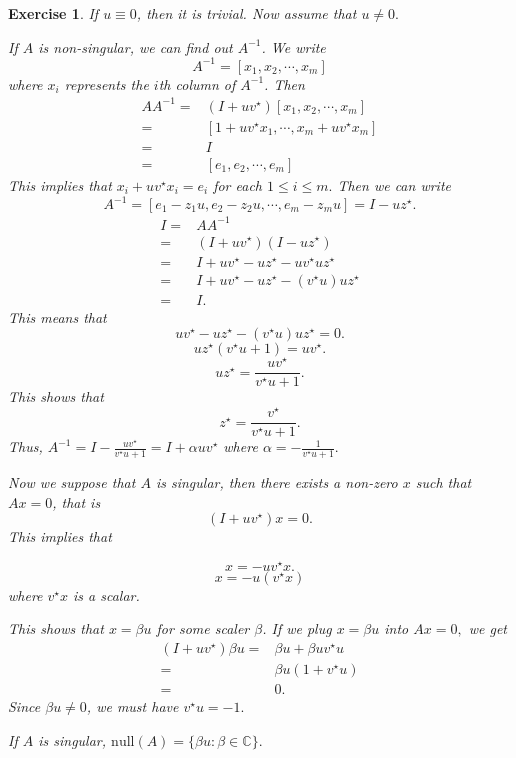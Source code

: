 \documentclass[paper=a4, fontsize=11pt]{scrartcl} %
\numberwithin{equation}{section} %
\numberwithin{figure}{section} %
\numberwithin{table}{section} %
\newtheorem{exercise}{Exercise}
\numberwithin{exercise}{section}
\begin{document}
\begin{exercise}

If $u\equiv 0$, then it is trivial. Now assume that $u\neq 0.$

If $A$ is non-singular, we can find out $A^{-1}$.  We write 
$$A^{-1}=\left[ x_1, x_2, \cdots, x_m \right]$$ where $x_i$ represents the $i$th column of $A^{-1}$.
Then 
\begin{align*}
AA^{-1}=& (I+uv^{\star})\left[ x_1, x_2, \cdots, x_m \right]\\
{}=& \left[1+uv^{\star}x_1, \cdots, x_m+uv^{\star} x_m\right]\\
{}=&I\\
{}=&\left[ e_1, e_2, \cdots, e_m\right]
\end{align*}
This implies that $x_i+uv^{\star} x_i=e_i$ for each $1\leq i\leq m.$
Then we can write 
$$A^{-1}=\left[e_1-z_1u, e_2-z_2u, \cdots, e_m-z_m u\right]=I-uz^{\star}.$$
\begin{align*}
I=& AA^{-1}\\
{}=& (I+ u v^{\star})(I-uz^{\star})\\
{}=& I +uv^{\star}-uz^{\star} -uv^{\star} uz^{\star}\\
{}=&  I +uv^{\star}-uz^{\star} -(v^{\star} u)uz^{\star}\\
{}=& I.
\end{align*}
This means that 
$$uv^{\star}-uz^{\star} -(v^{\star} u)uz^{\star}
=0.$$
$$uz^{\star} (v^{\star} u+1)=uv^{\star}.$$
$$uz^{\star}=\frac{uv^{\star}}{v^{\star}u+1}.$$
This shows that 
$$z^{\star}=\frac{v^{\star}}{v^{\star}u+1}.$$
Thus, $A^{-1}=I-\frac{uv^{\star}}{v^{\star}u+1}=I+\alpha uv^{\star}$ where $\alpha=-\frac{1}{v^{\star}u+1}.$

Now we suppose that $A$ is singular, then there exists a non-zero $x$ such that $Ax=0$, that is $$(I+uv^{\star})x=0.$$
This implies that 

$$x=-uv^{\star}x.$$
$$x=-u(v^{\star}x)$$
where $v^\star x$ is a scalar.

This shows that $x=\beta u$ for some scaler $\beta$. If we plug $x=\beta u$ into $Ax=0,$ we get 
\begin{align*}
(I+uv^{\star}) \beta u =& \beta u+\beta u v^{\star} u\\
{}=& \beta u(1+v^{\star} u)\\
{}=&0.
\end{align*}
Since $\beta u\neq 0$, we must have $v^{\star}u=-1.$

If $A$ is singular, $\mathrm{null} (A)=\{\beta u \colon \beta\in \mathbb{C}\}.$



\end{exercise}
\end{document}
